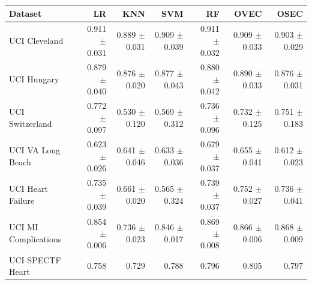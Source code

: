 \begin{tabular}{lrrrrrr}
\toprule
Dataset & LR & KNN & SVM & RF & OVEC & OSEC \\
\midrule
UCI Cleveland & 0.911 $\pm$ 0.031 & 0.889 $\pm$ 0.031 & 0.909 $\pm$ 0.039 & 0.911 $\pm$ 0.032 & 0.909 $\pm$ 0.033 & 0.903 $\pm$ 0.029 \\
UCI Hungary & 0.879 $\pm$ 0.040 & 0.876 $\pm$ 0.020 & 0.877 $\pm$ 0.043 & 0.880 $\pm$ 0.042 & 0.890 $\pm$ 0.033 & 0.876 $\pm$ 0.031 \\
UCI Switzerland & 0.772 $\pm$ 0.097 & 0.530 $\pm$ 0.120 & 0.569 $\pm$ 0.312 & 0.736 $\pm$ 0.096 & 0.732 $\pm$ 0.125 & 0.751 $\pm$ 0.183 \\
UCI VA Long Beach & 0.623 $\pm$ 0.026 & 0.641 $\pm$ 0.046 & 0.633 $\pm$ 0.036 & 0.679 $\pm$ 0.037 & 0.655 $\pm$ 0.041 & 0.612 $\pm$ 0.023 \\
UCI Heart Failure & 0.735 $\pm$ 0.039 & 0.661 $\pm$ 0.020 & 0.565 $\pm$ 0.324 & 0.739 $\pm$ 0.037 & 0.752 $\pm$ 0.027 & 0.736 $\pm$ 0.041 \\
UCI MI Complications & 0.854 $\pm$ 0.006 & 0.736 $\pm$ 0.023 & 0.846 $\pm$ 0.017 & 0.869 $\pm$ 0.008 & 0.866 $\pm$ 0.006 & 0.868 $\pm$ 0.009 \\
UCI SPECTF Heart & 0.758 & 0.729 & 0.788 & 0.796 & 0.805 & 0.797 \\
\bottomrule
\end{tabular}
